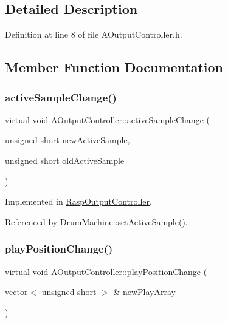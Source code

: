 \subsection{Detailed Description}


Definition at line 8 of file A\+Output\+Controller.\+h.



\subsection{Member Function Documentation}
\mbox{\label{class_a_output_controller_ac2b87aa6291c38cc65185bf6a37ae300}} 
\subsubsection{\texorpdfstring{active\+Sample\+Change()}{activeSampleChange()}}
{\footnotesize\ttfamily virtual void A\+Output\+Controller\+::active\+Sample\+Change (\begin{DoxyParamCaption}\item[{unsigned short}]{new\+Active\+Sample,  }\item[{unsigned short}]{old\+Active\+Sample }\end{DoxyParamCaption})\hspace{0.3cm}{\ttfamily [pure virtual]}}



Implemented in \hyperlink{class_rasp_output_controller_a92954cf26d4dd5f7d8835d1d508302c0}{Rasp\+Output\+Controller}.



Referenced by Drum\+Machine\+::set\+Active\+Sample().

\mbox{\label{class_a_output_controller_a7bad658dfc3eb1223ace0c0454130818}} 
\subsubsection{\texorpdfstring{play\+Position\+Change()}{playPositionChange()}\hspace{0.1cm}{\footnotesize\ttfamily [1/2]}}
{\footnotesize\ttfamily virtual void A\+Output\+Controller\+::play\+Position\+Change (\begin{DoxyParamCaption}\item[{vector$<$ unsigned short $>$ \&}]{new\+Play\+Array }\end{DoxyParamCaption})\hspace{0.3cm}{\ttfamily [pure virtual]}}



